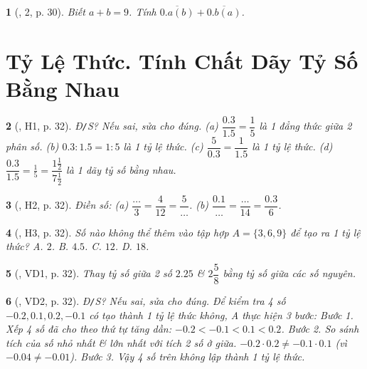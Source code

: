 \documentclass{article}
\newtheorem{baitoan}{}
\begin{document}
\begin{baitoan}[\cite{Binh_boi_duong_Toan_7_tap_1}, 2, p. 30]
	Biết $a + b = 9$. Tính $\overline{0.a(b)} + \overline{0.b(a)}$.
\end{baitoan}


\section{Tỷ Lệ Thức. Tính Chất Dãy Tỷ Số Bằng Nhau}

\begin{baitoan}[\cite{Binh_boi_duong_Toan_7_tap_1}, H1, p. 32]
	{\rm Đ{\tt/}S?} Nếu sai, sửa cho đúng. (a) $\dfrac{0.3}{1.5} = \dfrac{1}{5}$ là 1 đẳng thức giữa 2 phân số. (b) $0.3:1.5 = 1:5$ là 1 tỷ lệ thức. (c) $\dfrac{5}{0.3} = \dfrac{1}{1.5}$ là 1 tỷ lệ thức. (d) $\dfrac{0.3}{1.5} = \frac{1}{5} = \dfrac{1\frac{1}{2}}{7\frac{1}{2}}$ là 1 dãy tỷ số bằng nhau.
\end{baitoan}

\begin{baitoan}[\cite{Binh_boi_duong_Toan_7_tap_1}, H2, p. 32]
	Điền số: (a) $\dfrac{\ldots}{3} = \dfrac{4}{12} = \dfrac{5}{\ldots}$. (b) $\dfrac{0.1}{\ldots} = \dfrac{\ldots}{14} = \dfrac{0.3}{6}$.
\end{baitoan}

\begin{baitoan}[\cite{Binh_boi_duong_Toan_7_tap_1}, H3, p. 32]
	Số nào không thể thêm vào tập hợp $A = \{3,6,9\}$ để tạo ra 1 tỷ lệ thức? {\sf A.} $2$. {\sf B.} $4.5$. {\sf C.} $12$. {\sf D.} $18$.
\end{baitoan}

\begin{baitoan}[\cite{Binh_boi_duong_Toan_7_tap_1}, VD1, p. 32]
	Thay tỷ số giữa 2 số $2.25$ \& $2\dfrac{5}{8}$ bằng tỷ số giữa các số nguyên.
\end{baitoan}

\begin{baitoan}[\cite{Binh_boi_duong_Toan_7_tap_1}, VD2, p. 32]
	{\rm Đ{\tt/}S?} Nếu sai, sửa cho đúng. Để kiểm tra 4 số $-0.2,0.1,0.2,-0.1$ có tạo thành 1 tỷ lệ thức không, A thực hiện 3 bước: Bước 1. Xếp 4 số đã cho theo thứ tự tăng dần: $-0.2 < -0.1 < 0.1 < 0.2$. Bước 2. So sánh tích của số nhỏ nhất \& lớn nhất với tích 2 số ở giữa. $-0.2\cdot0.2\ne-0.1\cdot0.1$ (vì $-0.04\ne-0.01$). Bước 3. Vậy 4 số trên không lập thành 1 tỷ lệ thức.
\end{baitoan}
\end{document}
